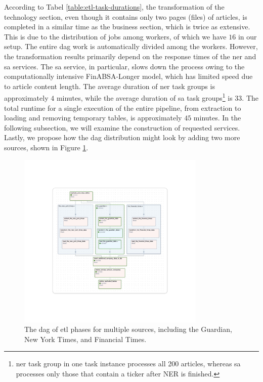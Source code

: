 According to Tabel \ref{table:etl-task-durations}, the transformation of the technology section, even though it contains only two pages (files) of articles, is completed in a similar time as the business section, which is twice as extensive. This is due to the distribution of jobs among workers, of which we have $16$ in our setup. The entire \acrshort{dag} work is automatically divided among the workers. However, the transformation results primarily depend on the response times of the \acrshort{ner} and \acrshort{sa} services. The \acrshort{sa} service, in particular, slows down the process owing to the computationally intensive FinABSA-Longer model, which has limited speed due to article content length. The average duration of \acrshort{ner} task groups is approximately $4$ minutes, while the average duration of \acrshort{sa} task groups\footnote{\acrshort{ner} task group in one task instance processes all 200 articles, whereas \acrshort{sa} processes only those that contain a ticker after NER is finished.} is $33$. The total runtime for a single execution of the entire pipeline, from extraction to loading and removing temporary tables, is approximately $45$ minutes. In the following subsection, we will examine the construction of requested services. Lastly, we propose how the \acrshort{dag} distribution might look by adding two more sources, shown in Figure \ref{fig:architecture-etl-sources}.

\begin{figure}[ht]
    \centering
    \includegraphics[width=0.8\textwidth]{img/architecture/etl-sources.pdf}
    \caption{The \acrshort{dag} of \acrshort{etl} phases for multiple sources, including the Guardian, New York Times, and Financial Times.}
    \label{fig:architecture-etl-sources}
\end{figure}

